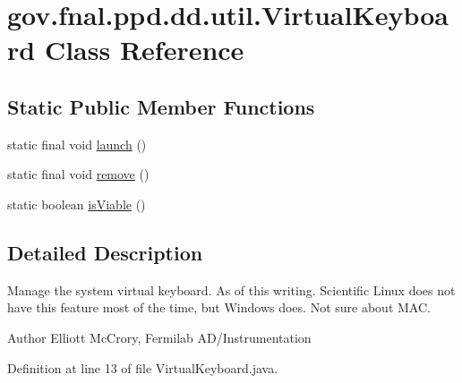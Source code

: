\hypertarget{classgov_1_1fnal_1_1ppd_1_1dd_1_1util_1_1VirtualKeyboard}{\section{gov.\-fnal.\-ppd.\-dd.\-util.\-Virtual\-Keyboard Class Reference}
\label{classgov_1_1fnal_1_1ppd_1_1dd_1_1util_1_1VirtualKeyboard}
}
\subsection*{Static Public Member Functions}
\begin{DoxyCompactItemize}
\item 
static final void \hyperlink{classgov_1_1fnal_1_1ppd_1_1dd_1_1util_1_1VirtualKeyboard_a2e4127247571b047a3f531f2b8875db6}{launch} ()
\item 
static final void \hyperlink{classgov_1_1fnal_1_1ppd_1_1dd_1_1util_1_1VirtualKeyboard_af8fa0153cbc34c2522b9c1f934c2d02f}{remove} ()
\item 
static boolean \hyperlink{classgov_1_1fnal_1_1ppd_1_1dd_1_1util_1_1VirtualKeyboard_aad08082770cb80392d9acd7d21e5245c}{is\-Viable} ()
\end{DoxyCompactItemize}


\subsection{Detailed Description}
Manage the system virtual keyboard. As of this writing. Scientific Linux does not have this feature most of the time, but Windows does. Not sure about M\-A\-C.

\begin{DoxyAuthor}{Author}
Elliott Mc\-Crory, Fermilab A\-D/\-Instrumentation 
\end{DoxyAuthor}


Definition at line 13 of file Virtual\-Keyboard.\-java.



